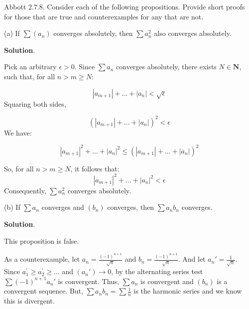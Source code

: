 \documentclass[10pt]{article}
\begin{document}
Abbott 2.7.8. Consider each of the following propositions. Provide short proofs for those that are true and counterexamples for any that are not.



(a) If $\displaystyle \sum ( a_{n})$ converges absolutely, then $\displaystyle \sum a_{n}^{2}$ also converges absolutely.



\textbf{Solution}.

Pick an arbitrary $\displaystyle \epsilon  >0$. Since $\displaystyle \sum a_{n}$ converges absolutely, there exists $\displaystyle N\in \mathbf{N}$, such that, for all $\displaystyle n >m\geq N$:


\begin{equation*}
|a_{m+1} |+\dotsc +|a_{n} |< \sqrt{\epsilon }
\end{equation*}
Squaring both sides,


\begin{equation*}
( |a_{m+1} |+\dotsc +|a_{n} |)^{2} < \epsilon 
\end{equation*}
We have:


\begin{equation*}
|a_{m+1} |^{2} +\dotsc +|a_{n} |^{2} \leq ( |a_{m+1} |+\dotsc +|a_{n} |)^{2}
\end{equation*}


So, for all $\displaystyle n >m\geq N$, it follows that:
\begin{equation*}
|a_{m+1} |^{2} +\dotsc +|a_{n} |^{2} < \epsilon 
\end{equation*}
Consequently, $\displaystyle \sum a_{n}^{2}$ converges absolutely.



(b) If $\displaystyle \sum a_{n}$ converges and $\displaystyle ( b_{n})$ converges, then $\displaystyle \sum a_{n} b_{n}$ converges.



\textbf{Solution}.



This proposition is false.



As a counterexample, let $\displaystyle a_{n} =\frac{( -1)^{n+1}}{\sqrt{n}}$ and $\displaystyle b_{n} =\frac{( -1)^{n+1}}{\sqrt{n}}$. And let $\displaystyle a_{n} '=\frac{1}{\sqrt{n}}$. Since $\displaystyle a_{1}^{'} \geq a_{2}^{'} \geq \dotsc $ and $\displaystyle ( a_{n} ')\rightarrow 0$, by the alternating series test $\displaystyle \sum ( -1)^{n+1} a_{n} '$ is convergent. Thus, $\displaystyle \sum a_{n}$ is convergent and $\displaystyle ( b_{n})$ is a convergent sequence. But, $\displaystyle \sum a_{n} b_{n} =\sum \frac{1}{n}$ is the harmonic series and we know this is divergent.
\end{document}
